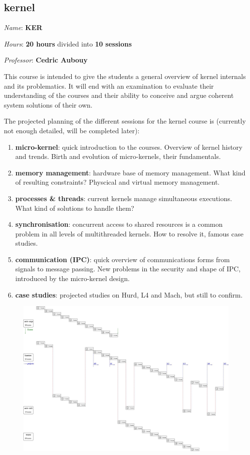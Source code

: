 \begin{multicols}{2}
%
%

\section{kernel}

\textit{Name}: \textbf{KER}

\textit{Hours}: \textbf{20 hours} divided into \textbf{10 sessions}

\textit{Professor}: \textbf{Cedric Aubouy}

This course is intended to give the students a general overview of
kernel internals and its problematics. It will end with an examination to
evaluate their understanding of the courses and their ability to
conceive and argue coherent system solutions of their own.

The projected planning of the different sessions for the kernel
course is (currently not enough detailed, will be completed later):

\begin{enumerate}
  \item
    \textbf{micro-kernel}: quick introduction to the courses. Overview
    of kernel history and trends. Birth and evolution of micro-kernels, their
    fundamentals.
  \item
    \textbf{memory management}: hardware base of memory management. What
    kind of resulting constraints? Physcical and virtual memory management.
  \item
    \textbf{processes \& threads}: current kernels manage simultaneous
    executions. What kind of solutions to handle them?
  \item
    \textbf{synchronisation}: concurrent access to shared resources is a
    common problem in all levels of multithreaded kernels. How to resolve it,
    famous case studies.
  \item
    \textbf{communication (IPC)}: quick overview of communications forms
    from signals to message passing. New problems in the security and shape of
    IPC, introduced by the micro-kernel design.
  \item
    \textbf{case studies}: projected studies on Hurd, L4 and Mach, but still
    to confirm.
\end{enumerate}




\end{multicols}

\begin{figure}[h]
\centerline{\includegraphics[angle=-90,scale=0.3]{figures/schedule.jpg}}
\end{figure}


